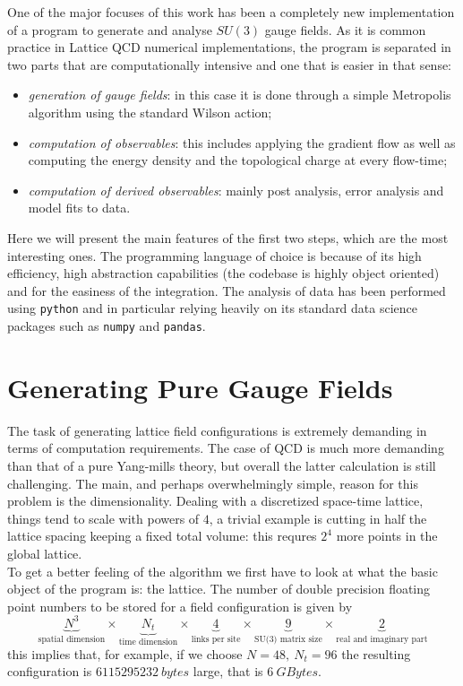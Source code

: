 One of the major focuses of this work has been a completely new implementation of a program to generate and analyse $SU(3)$ gauge fields. As it is common practice in Lattice QCD numerical implementations, the program is separated in two parts that are computationally intensive and one that is easier in that sense:
\begin{itemize}
    \item \textit{generation of gauge fields}: in this case it is done through a simple Metropolis algorithm using the standard Wilson action;
    \item \textit{computation of observables}: this includes applying the gradient flow as well as computing the energy density and the topological charge at every flow-time;
    \item \textit{computation of derived observables}: mainly post analysis, error analysis and model fits to data. 
\end{itemize}
Here we will present the main features of the first two steps, which are the most interesting ones. The programming language of choice is \cpp because of its high efficiency, high abstraction capabilities (the codebase is highly object oriented) and for the easiness of the \mpi integration. The analysis of data has been performed using \texttt{python} and in particular relying heavily on its standard data science packages such as \texttt{numpy} and \texttt{pandas}.

\section{Generating Pure Gauge Fields}
The task of generating lattice field configurations is extremely demanding in terms of computation requirements. The case of QCD is much more demanding than that of a pure Yang-mills theory, but overall the latter calculation is still challenging. The main, and perhaps overwhelmingly simple, reason for this problem is the dimensionality. Dealing with a discretized space-time lattice, things tend to scale with powers of $4$, a trivial example is cutting in half the lattice spacing keeping a fixed total volume: this requres $2^4$ more points in the global lattice. \\
To get a better feeling of the algorithm we first have to look at what the basic object of the program is: the lattice. The number of double precision floating point numbers to be stored for a field configuration is given by
\begin{equation}
    \underbrace{N^3}_\text{spatial dimension} \times
    \underbrace{N_t}_\text{time dimension} \times
    \underbrace{4}_\text{links per site} \times
    \underbrace{9}_\text{SU(3) matrix size} \times
    \underbrace{2}_\text{real and imaginary part}
\end{equation}
this implies that, for example, if we choose $N=48,~N_t=96$ the resulting configuration is $6115295232~bytes$ large, that is $6~GBytes$. 